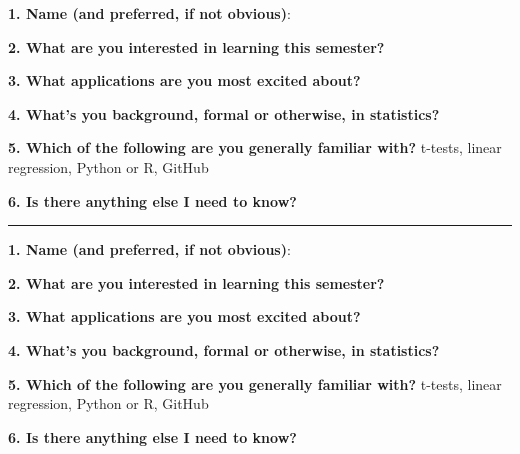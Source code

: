 \documentclass[12pt]{article}
\begin{document}
\textbf{1. Name (and preferred, if not obvious)}:

\vspace{1cm}

\textbf{2. What are you interested in learning this semester?}

\vspace{2cm}

\textbf{3. What applications are you most excited about?}

\vspace{2cm}

\textbf{4. What’s you background, formal or otherwise, in statistics?}

\vspace{2cm}

\textbf{5. Which of the following are you generally familiar with?}
\quad t-tests, linear regression, Python or R, GitHub

\vspace{1cm}

\textbf{6. Is there anything else I need to know?}

\vspace{1cm}

\noindent\rule{19cm}{3pt}

\vspace{1cm}

\textbf{1. Name (and preferred, if not obvious)}:

\vspace{1cm}

\textbf{2. What are you interested in learning this semester?}

\vspace{2cm}

\textbf{3. What applications are you most excited about?}

\vspace{2cm}

\textbf{4. What’s you background, formal or otherwise, in statistics?}

\vspace{2cm}

\textbf{5. Which of the following are you generally familiar with?}
\quad t-tests, linear regression, Python or R, GitHub

\vspace{1cm}

\textbf{6. Is there anything else I need to know?}

\vspace{1cm}
\end{document}
